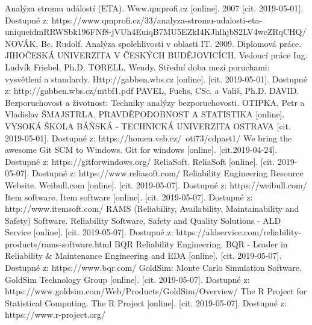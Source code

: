 \documentclass[FM,RP]{tulthesis}
\begin{document}
\begin{thebibliography}{Mm99}
        Analýza stromu událostí (ETA). Www.qmprofi.cz [online]. 2007 [cit. 2019-05-01]. Dostupné z: https://www.qmprofi.cz/33/analyza-stromu-udalosti-eta-uniqueidmRRWSbk196FNf8-jVUh4EuiqB7MU5EZkI4KJhlhjbS2LV4wcZRqCHQ/
        NOVÁK, Bc. Rudolf. Analýza spolehlivosti v oblasti IT. 2009. Diplomová práce. JIHOČESKÁ UNIVERZITA V ČESKÝCH BUDĚJOVICÍCH. Vedoucí práce Ing. Ludvík Friebel, Ph.D.
        TORELL, Wendy. Střední doba mezi poruchami: vysvětlení a standardy. Http://gabben.wbs.cz [online]. [cit. 2019-05-01]. Dostupné z: http://gabben.wbs.cz/mtbf1.pdf
        PAVEL, Fuchs, CSc. a Vališ, Ph.D. DAVID. Bezporuchovost a životnost: Techniky analýzy bezporuchovosti.
        OTIPKA, Petr a Vladislav ŠMAJSTRLA. PRAVDĚPODOBNOST A STATISTIKA [online]. VYSOKÁ ŠKOLA BÁŇSKÁ - TECHNICKÁ UNIVERZITA OSTRAVA [cit. 2019-05-01]. Dostupné z: https://homen.vsb.cz/~oti73/cdpast1/
        We bring the awesome Git SCM to Windows. Git for windows [online]. [cit.2019-04-24]. Dostupné z: https://gitforwindows.org/
        ReliaSoft. ReliaSoft [online]. [cit. 2019-05-07]. Dostupné z: https://www.reliasoft.com/
        Reliability Engineering Resource Website. Weibull.com [online]. [cit. 2019-05-07]. Dostupné z: https://weibull.com/
        Item software. Item software [online]. [cit. 2019-05-07]. Dostupné z: http://www.itemsoft.com/
        RAMS (Reliability, Availability, Maintainability and Safety) Software. Reliability Software, Safety and Quality Solutions - ALD Service [online]. [cit. 2019-05-07]. Dostupné z: https://aldservice.com/reliability-products/rams-software.html
        BQR Reliability Engineering. BQR - Leader in Reliability \& Maintenance Engineering and EDA [online]. [cit. 2019-05-07]. Dostupné z: https://www.bqr.com/
        GoldSim: Monte Carlo Simulation Software. GoldSim Technology Group [online]. [cit. 2019-05-07]. Dostupné z: https://www.goldsim.com/Web/Products/GoldSim/Overview/
        The R Project for Statistical Computing. The R Project [online]. [cit. 2019-05-07]. Dostupné z: https://www.r-project.org/
\end{thebibliography}
\end{document}
